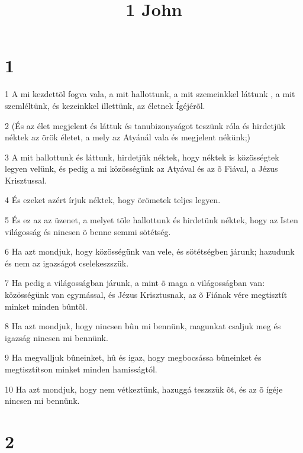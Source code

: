 

\title{1 John}


\chapter{1}

\par 1 A mi kezdettõl fogva vala, a mit hallottunk, a mit szemeinkkel láttunk  , a mit szemléltünk, és kezeinkkel illettünk, az életnek Ígéjérõl.
\par 2 (És az élet megjelent és láttuk és tanubizonyságot teszünk róla és hirdetjük néktek az örök  életet, a mely az Atyánál vala és megjelent nékünk;)
\par 3 A mit hallottunk és láttunk, hirdetjük néktek, hogy néktek is közösségtek legyen velünk, és pedig a mi közösségünk az Atyával és az õ Fiával, a Jézus Krisztussal.
\par 4 És ezeket azért írjuk néktek, hogy örömetek teljes legyen.
\par 5 És ez az az üzenet, a melyet tõle hallottunk és hirdetünk néktek, hogy az Isten világosság és nincsen õ benne semmi sötétség.
\par 6 Ha azt mondjuk, hogy közösségünk van vele, és sötétségben járunk; hazudunk és nem az igazságot cselekeszszük.
\par 7 Ha pedig a világosságban járunk, a mint õ maga a világosságban van: közösségünk van egymással, és Jézus Krisztusnak, az õ Fiának vére megtisztít minket minden bûntõl.
\par 8 Ha azt mondjuk, hogy nincsen bûn mi bennünk, magunkat csaljuk meg és igazság nincsen mi bennünk.
\par 9 Ha megvalljuk bûneinket, hû és igaz, hogy megbocsássa bûneinket és megtisztítson minket minden hamisságtól.
\par 10 Ha azt mondjuk, hogy nem vétkeztünk, hazuggá teszszük õt, és az õ ígéje nincsen mi bennünk.

\chapter{2}

